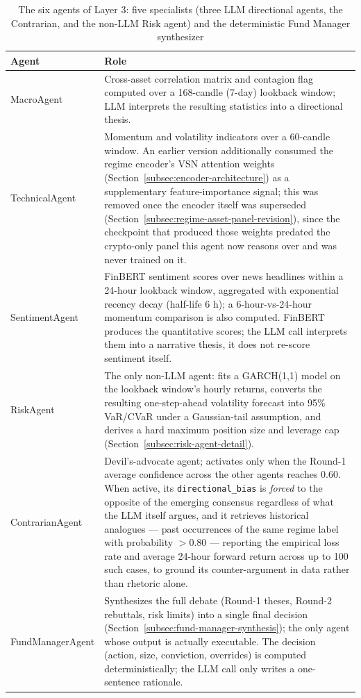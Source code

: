 \begin{table}[H]
\centering
\small
\caption{The six agents of Layer 3: five specialists (three LLM directional agents, the Contrarian, and the non-LLM Risk agent) and the deterministic Fund Manager synthesizer}
\label{tab:agent-roster}
\begin{tabular}{|l|p{9.5cm}|}
\hline
\textbf{Agent} & \textbf{Role} \\
\hline
MacroAgent & Cross-asset correlation matrix and contagion flag computed over a 168-candle (7-day) lookback window; LLM interprets the resulting statistics into a directional thesis. \\
\hline
TechnicalAgent & Momentum and volatility indicators over a 60-candle window. An earlier version additionally consumed the regime encoder's VSN attention weights (Section~\ref{subsec:encoder-architecture}) as a supplementary feature-importance signal; this was removed once the encoder itself was superseded (Section~\ref{subsec:regime-asset-panel-revision}), since the checkpoint that produced those weights predated the crypto-only panel this agent now reasons over and was never trained on it. \\
\hline
SentimentAgent & FinBERT \cite{finbert2019} sentiment scores over news headlines within a 24-hour lookback window, aggregated with exponential recency decay (half-life 6 h); a 6-hour-vs-24-hour momentum comparison is also computed. FinBERT produces the quantitative scores; the LLM call interprets them into a narrative thesis, it does not re-score sentiment itself. \\
\hline
RiskAgent & The only non-LLM agent: fits a GARCH(1,1) model on the lookback window's hourly returns, converts the resulting one-step-ahead volatility forecast into 95\% VaR/CVaR under a Gaussian-tail assumption, and derives a hard maximum position size and leverage cap (Section~\ref{subsec:risk-agent-detail}). \\
\hline
ContrarianAgent & Devil's-advocate agent; activates only when the Round-1 average confidence across the other agents reaches 0.60. When active, its \texttt{directional\_bias} is \emph{forced} to the opposite of the emerging consensus regardless of what the LLM itself argues, and it retrieves historical analogues --- past occurrences of the same regime label with probability $>0.80$ --- reporting the empirical loss rate and average 24-hour forward return across up to 100 such cases, to ground its counter-argument in data rather than rhetoric alone. \\
\hline
FundManagerAgent & Synthesizes the full debate (Round-1 theses, Round-2 rebuttals, risk limits) into a single final decision (Section~\ref{subsec:fund-manager-synthesis}); the only agent whose output is actually executable. The decision (action, size, conviction, overrides) is computed deterministically; the LLM call only writes a one-sentence rationale. \\
\hline
\end{tabular}
\normalsize
\end{table}


